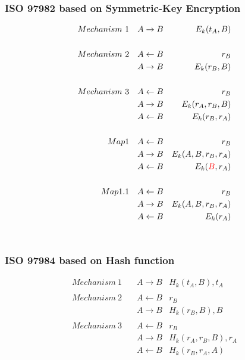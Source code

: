 \subsubsection{ISO 9798\text{-}2 based on Symmetric-Key Encryption}

\begin{eqnarray*}
    Mechanism~1 \quad & A  \rightarrow B &  E_k(t_A,B)\\
    \\
    Mechanism~2 \quad & A \leftarrow  B & r_B \\
                & A  \rightarrow B & E_k(r_B,B) \\
    \\
    Mechanism~3 \quad & A  \leftarrow B & r_B \\
                & A  \rightarrow B & E_k(r_A,r_B,B) \\
                & A  \leftarrow  B & E_k(r_B,r_A) \\
    \\
    Map1 \quad & A  \leftarrow B & r_B \\
                & A  \rightarrow B & E_k(A, B, r_B,r_A) \\
                & A  \leftarrow  B & E_k(\textcolor{red}{B},r_A) \\
    \\
    Map1.1 \quad & A  \leftarrow B & r_B \\
                & A  \rightarrow B & E_k(A, B, r_B,r_A) \\
                & A  \leftarrow  B & E_k(r_A) 
\end{eqnarray*}\\

\subsubsection{ISO 9798\text{-}4 based on Hash function}
\begin{eqnarray*}
    Mechanism~1 \quad & A \rightarrow B & H_k(t_A,B),t_A \\
    \\
    Mechanism~2 \quad & A \leftarrow B & r_B \\
                      & A \rightarrow B & H_k(r_B,B),B \\
    \\
    Mechanism~3 \quad & A \leftarrow B & r_B \\
                      & A \rightarrow B & H_k(r_A,r_B,B),r_A \\
                      & A \leftarrow B & H_k(r_B,r_A,A) 
\end{eqnarray*}

